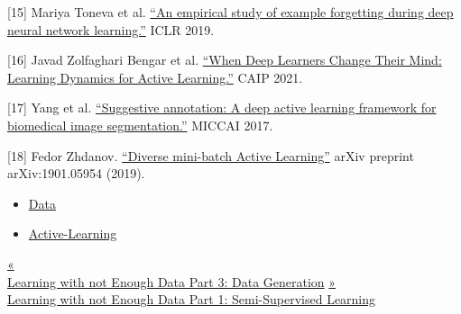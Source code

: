{[}15{]} Mariya Toneva et al. \href{https://arxiv.org/abs/1812.05159}{``An empirical study of example forgetting during deep neural network learning.''} ICLR 2019.

{[}16{]} Javad Zolfaghari Bengar et al. \href{https://arxiv.org/abs/2107.14707}{``When Deep Learners Change Their Mind: Learning Dynamics for Active Learning.''} CAIP 2021.

{[}17{]} Yang et al. \href{https://arxiv.org/abs/1706.04737}{``Suggestive annotation: A deep active learning framework for biomedical image segmentation.''} MICCAI 2017.

{[}18{]} Fedor Zhdanov. \href{https://arxiv.org/abs/1901.05954}{``Diverse mini-batch Active Learning''} arXiv preprint arXiv:1901.05954 (2019).

\begin{itemize}
\tightlist
\item
  \href{https://lilianweng.github.io/tags/data/}{Data}
\item
  \href{https://lilianweng.github.io/tags/active-learning/}{Active-Learning}
\end{itemize}

\href{https://lilianweng.github.io/posts/2022-04-15-data-gen/}{{« }\\
{Learning with not Enough Data Part 3: Data Generation}} \href{https://lilianweng.github.io/posts/2021-12-05-semi-supervised/}{{ »}\\
{Learning with not Enough Data Part 1: Semi-Supervised Learning}}

